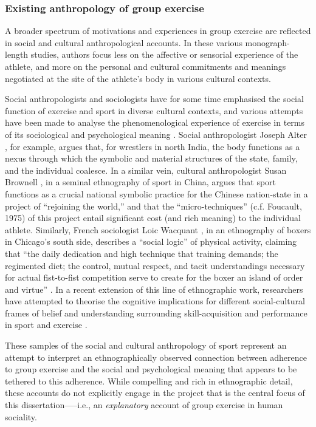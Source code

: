 \begin{CJK}{UTF8}{gbsn}
\subsubsection{Existing anthropology of group exercise}
A broader spectrum of motivations and experiences in group exercise are reflected in social and cultural anthropological accounts.  In these various monograph-length studies, authors focus less on the affective or sensorial experience of the athlete, and more on the personal and cultural commitments and meanings negotiated at the site of the athlete’s body in various cultural contexts.

Social anthropologists and sociologists have for some time emphasised the social function of exercise and sport in diverse cultural contexts, and various attempts have been made to analyse the phenomenological experience of exercise in terms of its sociological and psychological meaning \citep{Bourdieu1978}.  Social anthropologist Joseph Alter \textcite{Alter1993}, for example, argues that, for wrestlers in north India, the body functions as a nexus through which the symbolic and material structures of the state, family, and the individual coalesce.  In a similar vein, cultural anthropologist Susan Brownell \textcite{Bronwell1995}, in a seminal ethnography of sport in China, argues that sport functions as a crucial national symbolic practice for the Chinese nation-state in a project of ``rejoining the world,'' and that the ``micro-techniques'' (c.f. Foucault, 1975) of this project entail significant cost (and rich meaning) to the individual athlete.   Similarly, French sociologist Loic Wacquant \textcite{Wacquant2004}, in an ethnography of boxers in Chicago’s south side, describes a ``social logic'' of physical activity, claiming that ``the daily dedication and high technique that training demands; the regimented diet; the control, mutual respect, and tacit understandings necessary for actual fist-to-fist competition serve to create for the boxer an island of order and virtue'' \textcite[17]{Wacquant2004}.  In a recent extension of this line of ethnographic work, researchers have attempted to theorise the cognitive implications for different social-cultural frames of belief and understanding surrounding skill-acquisition and performance in sport and exercise \citep{Downey2005bDowney2007,Marchand2010}.

These samples of the social and cultural anthropology of sport represent an attempt to interpret an ethnographically observed connection between adherence to group exercise and the social and psychological meaning that appears to be tethered to this adherence.  While compelling and rich in ethnographic detail, these accounts do not explicitly engage in the project that is the central focus of this dissertation—--i.e., an \textit{explanatory} account of group exercise in human sociality.



\end{CJK}
